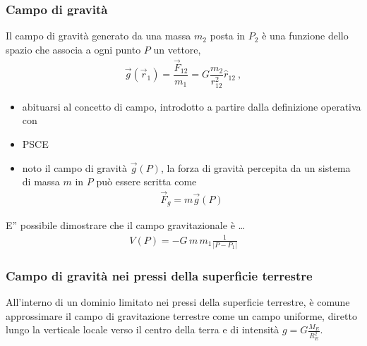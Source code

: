 \documentclass[letterpaper,10pt,italian]{jupyterBook}
\begin{document}
\subsubsection{Campo di gravità}
\label{\detokenize{ch/mechanics/actions-examples:campo-di-gravita}}\label{\detokenize{ch/mechanics/actions-examples:physics-hs-mechanics-actions-gravitation-field}}
\sphinxAtStartPar
Il campo di gravità generato da una massa \(m_2\) posta in \(P_2\) è  una funzione dello spazio che associa a ogni punto \(P\) un vettore,
\begin{equation*}
\begin{split}\vec{g}(\vec{r}_1) = \dfrac{\vec{F}_{12}}{m_1} = G \dfrac{m_2}{r_{12}^2} \hat{r}_{12} \ ,\end{split}
\end{equation*}\begin{itemize}
\item {} 
\sphinxAtStartPar
{} abituarsi al concetto di campo, introdotto a partire dalla definizione operativa con 

\item {} 
\sphinxAtStartPar
{} PSCE

\item {} 
\sphinxAtStartPar
{} noto il campo di gravità \(\vec{g}(P)\), la forza di gravità percepita da un sistema di massa \(m\) in \(P\) può essere scritta come
\begin{equation*}
\begin{split}\vec{F}_g = m \vec{g}(P)\end{split}
\end{equation*}
\end{itemize}

\sphinxAtStartPar
{} E” possibile dimostrare che il campo gravitazionale è … 
\begin{equation*}
\begin{split}V(P) = - G \, m \, m_1 \frac{1}{|P - P_1|}\end{split}
\end{equation*}

\subsubsection{Campo di gravità nei pressi della superficie terrestre}
\label{\detokenize{ch/mechanics/actions-examples:campo-di-gravita-nei-pressi-della-superficie-terrestre}}\label{\detokenize{ch/mechanics/actions-examples:physics-hs-mechanics-actions-gravitation-earth}}
\sphinxAtStartPar
All’interno di un dominio limitato nei pressi della superficie terrestre, è comune approssimare il campo di gravitazione terrestre come un campo uniforme, diretto lungo la verticale locale verso il centro della terra e di intensità \(g = G \frac{M_E}{R_E^2}\).
\end{document}
